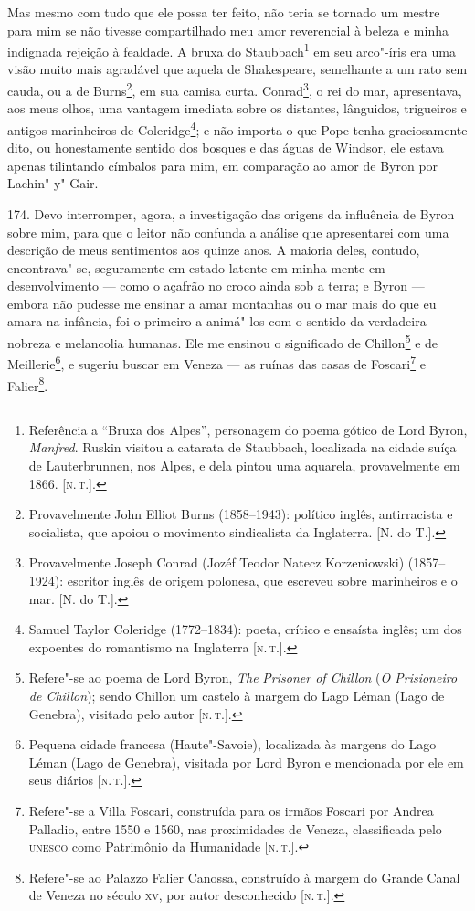 Mas mesmo com tudo que ele possa ter feito, não teria se tornado um
mestre para mim se não tivesse compartilhado meu amor reverencial à
beleza e minha indignada rejeição à fealdade. A bruxa do
Staubbach\footnote{Referência a ``Bruxa dos Alpes'', personagem do poema
  gótico de Lord Byron, \emph{Manfred}. Ruskin visitou a catarata de
  Staubbach, localizada na cidade suíça de Lauterbrunnen, nos Alpes, e
  dela pintou uma aquarela, provavelmente em 1866. {[}\textsc{n.\,t.}{]}.} em
seu arco"-íris era uma visão muito mais agradável que aquela de
Shakespeare, semelhante a um rato sem cauda, ou a de Burns\footnote{Provavelmente
  John Elliot Burns (1858--1943): político inglês, antirracista e
  socialista, que apoiou o movimento sindicalista da Inglaterra. {[}N.
  do T.{]}.}, em sua camisa curta. Conrad\footnote{Provavelmente Joseph
  Conrad (Jozéf Teodor Natecz Korzeniowski) (1857--1924): escritor inglês
  de origem polonesa, que escreveu sobre marinheiros e o mar. {[}N. do
  T.{]}.}, o rei do mar, apresentava, aos meus olhos, uma vantagem
imediata sobre os distantes, lânguidos, trigueiros e antigos marinheiros
de Coleridge\footnote{Samuel Taylor Coleridge (1772--1834): poeta,
  crítico e ensaísta inglês; um dos expoentes do romantismo na
  Inglaterra {[}\textsc{n.\,t.}{]}.}; e não importa o que Pope tenha
graciosamente dito, ou honestamente sentido dos bosques e das águas de
Windsor, ele estava apenas tilintando címbalos para mim, em comparação
ao amor de Byron por Lachin"-y"-Gair.

174. Devo interromper, agora, a investigação das origens da influência
de Byron sobre mim, para que o leitor não confunda a análise que
apresentarei com uma descrição de meus sentimentos aos quinze anos. A
maioria deles, contudo, encontrava"-se, seguramente em estado latente em
minha mente em desenvolvimento --- como o açafrão no croco ainda sob a
terra; e Byron --- embora não pudesse me ensinar a amar montanhas ou o
mar mais do que eu amara na infância, foi o primeiro a animá"-los com o
sentido da verdadeira nobreza e melancolia humanas. Ele me ensinou o
significado de Chillon\footnote{Refere"-se ao poema de Lord Byron,
  \emph{The} \emph{Prisoner of Chillon} (\emph{O Prisioneiro de
  Chillon}); sendo Chillon um castelo à margem do Lago Léman (Lago de
  Genebra), visitado pelo autor {[}\textsc{n.\,t.}{]}.} e de
Meillerie\footnote{Pequena cidade francesa (Haute"-Savoie), localizada às
  margens do Lago Léman (Lago de Genebra), visitada por Lord Byron e
  mencionada por ele em seus diários {[}\textsc{n.\,t.}{]}.}, e sugeriu buscar
em Veneza --- as ruínas das casas de Foscari\footnote{Refere"-se a Villa
  Foscari, construída para os irmãos Foscari por Andrea Palladio, entre
  1550 e 1560, nas proximidades de Veneza, classificada pelo \textsc{unesco} como
  Patrimônio da Humanidade {[}\textsc{n.\,t.}{]}.} e Falier\footnote{Refere"-se
  ao Palazzo Falier Canossa, construído à margem do Grande Canal de
  Veneza no século \textsc{xv}, por autor desconhecido {[}\textsc{n.\,t.}{]}.}.

